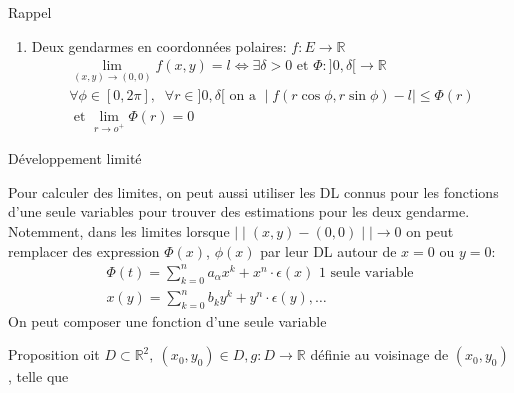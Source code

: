 \begin{parag}{Rappel}
\begin{enumerate}
        \item Deux gendarmes en coordonnées polaires: $f: E \to \mathbb{R}$\\
           \begin{align*}
               \lim_{(x, y) \to (0, 0)} f(x, y) = l \iff \exists \delta > 0 \text{ et } \Phi : ]0, \delta[ \to \mathbb{R}\\
               \forall \phi \in [0, 2\pi], \; \; \forall r \in ]0, \delta [ \text{ on a } \mid f(r\cos\phi, r\sin\phi) - l \mid \leq \Phi(r) \\
               \text{ et } \lim_{r \to o^+} \Phi(r) = 0
           \end{align*}
    \end{enumerate}
    

\end{parag}

\begin{parag}{Développement limité}

    Pour calculer des limites, on peut aussi utiliser les DL connus pour les fonctions d'une seule variables pour trouver des estimations pour les deux gendarme.\\
    Notemment, dans les limites lorsque $ \mid \mid (x, y) - (0, 0) \mid \mid \to 0$ on peut remplacer des expression $\Phi(x)$, $\phi(x)$ par leur DL autour de $x = 0$ ou $y = 0$:
    \begin{align*}
        \Phi(t) = \sum_{k= 0}^n a_\alpha x^k + x^n \cdot \epsilon(x) \text{ 1 seule variable}\\
        x(y) = \sum_{k=0}^n b_k y^k + y^n \cdot \epsilon(y), \dots
    \end{align*}
   On peut composer une fonction d'une seule variable 
   \begin{subparag}{Proposition}
       oit $D \subset \mathbb{R}^2, \: (x_0, y_0) \in D, g:D \to \mathbb{R}$ définie au voisinage de $(x_0, y_0)$, telle que 
       
   \end{subparag}
\end{parag}


